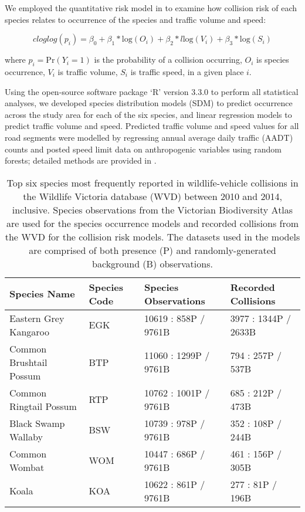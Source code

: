 We employed the quantitative risk model in  to examine how collision risk of each species relates to occurrence of the species and traffic volume and speed: 

\begin{equation} \label{eq:31}
cloglog(p_i) = \beta_0 + \beta_1*\text{log}(O_i) + \beta_2*l\text{log}(V_i) + \beta_3*\text{log}(S_i)
\end{equation}

\noindent where $p_i=\text{Pr}(Y_i=1)$ is the probability of a collision occurring, $O_i$ is species occurrence, $V_i$ is traffic volume, $S_i$ is traffic speed, in a given place $i$.

Using the open-source software package `R' version 3.3.0 \citep{rdct16} to perform all statistical analyses, we developed species distribution models (SDM) to predict occurrence across the study area for each of the six species, and linear regression models to predict traffic volume and speed. Predicted traffic volume and speed values for all road segments were modelled by regressing annual average daily traffic (AADT) counts and posted speed limit data on anthropogenic variables using random forests; detailed methods are provided in . 

\begin{table}[htp]
\caption[Six mammal species most frequently reported in wildlife-vehicle collisions]{Top six species most frequently reported in wildlife-vehicle collisions in the Wildlife Victoria database (WVD) between 2010 and 2014, inclusive. Species observations from the Victorian Biodiversity Atlas are used for the species occurrence models and recorded collisions from the WVD for the collision risk models. The datasets used in the models are comprised of both presence (P) and randomly-generated background (B) observations.}
\begin{tabularx}{\textwidth}{llll} \toprule
Species Name                     &Species Code     &Species Observations     &Recorded Collisions \\ \midrule 
Eastern Grey Kangaroo 	& EGK	& 10619 : 858P / 9761B 	& 3977 : 1344P / 2633B \\ 
Common Brushtail Possum & BTP	& 11060 : 1299P / 9761B	& 794 : 257P / 537B \\ 
Common Ringtail Possum 	& RTP	& 10762 : 1001P / 9761B	& 685 : 212P / 473B \\ 
Black Swamp Wallaby 	& BSW	& 10739 : 978P / 9761B 	& 352 : 108P / 244B \\ 
Common Wombat 			& WOM	& 10447 : 686P / 9761B 	& 461 : 156P / 305B \\ 
Koala 					& KOA 	& 10622 : 861P / 9761B 	& 277 : 81P / 196B \\ 
\bottomrule
\end{tabularx}
\label{6sp_species_data}
\end{table}

